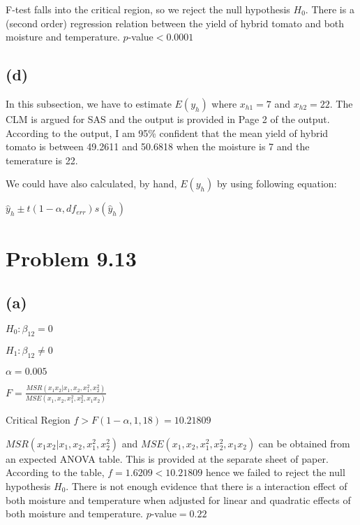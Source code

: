 \documentclass[letterpaper]{article}
\begin{document}
\begin{flushleft}
F-test falls into the critical region, so we reject the null hypothesis $H_0$. There is a (second order) regression relation between the yield of hybrid tomato and both moisture and temperature. $p$-value$ < 0.0001$
\end{flushleft}

\subsection{(d)}
\begin{flushleft}
In this subsection, we have to estimate $E(y_h)$ where $x_{h1} = 7$ and $x_{h2} = 22$. The CLM is argued for SAS and the output is provided in Page 2 of the output. According to the output, I am 95\% confident that the mean yield of hybrid tomato is between 49.2611 and 50.6818 when the moisture is 7 and the temerature is 22.
\end{flushleft}

\begin{flushleft}
We could have also calculated, by hand, $E(y_h)$ by using following equation:
\end{flushleft}

\begin{center}
$\hat{y}_h \pm t(1 - \alpha, df_{err}) s(\hat{y}_h)$
\end{center}

\section{Problem 9.13}

\subsection{(a)}
\begin{center}
$H_0: \beta_{12}=0$

$H_1: \beta_{12}\neq0$

$\alpha = 0.005$

$F = \frac{MSR(x_1x_2|x_1,x_2,x^2_1,x^2_2)}{MSE(x_1, x_2, x^2_1, x^2_2, x_1x_2)}$

Critical Region $f > F(1 - \alpha, 1, 18) = 10.21809$
\end{center}

\begin{flushleft}
$MSR(x_1x_2|x_1,x_2,x^2_1,x^2_2)$ and $MSE(x_1, x_2, x^2_1, x^2_2, x_1x_2)$ can be obtained from an expected ANOVA table. This is provided at the separate sheet of paper. According to the table, $f = 1.6209 < 10.21809$ hence we failed to reject the null hypothesis $H_0$. There is not enough evidence that there is a interaction effect of both moisture and temperature when adjusted for linear and quadratic effects of both moisture and temperature. $p$-value$=0.22$
\end{flushleft}
\end{document}
